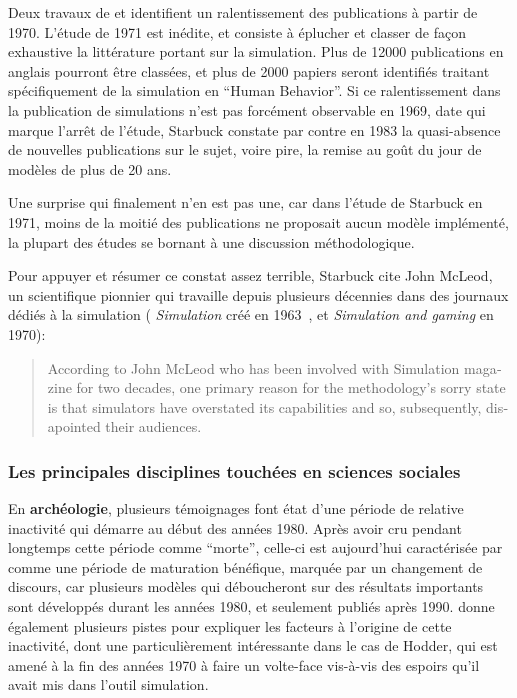 Deux travaux de \textcite{Dutton1971} et \textcite{Starbuck1983} identifient un ralentissement des publications à partir de 1970. L'étude de 1971 est inédite, et consiste à éplucher et classer de façon exhaustive la littérature portant sur la simulation. Plus de 12000 publications en anglais pourront être classées, et plus de 2000 papiers seront identifiés traitant spécifiquement de la simulation en \foreignquote{english}{Human Behavior}. Si ce ralentissement dans la publication de simulations n'est pas forcément observable en 1969, date qui marque l'arrêt de l'étude, Starbuck constate par contre en 1983 la quasi-absence de nouvelles publications sur le sujet, voire pire, la remise au goût du jour de modèles de plus de 20 ans.

Une surprise qui finalement n'en est pas une, car dans l'étude de Starbuck en 1971, moins de la moitié des publications ne proposait aucun modèle implémenté, la plupart des études se bornant à une discussion méthodologique.

Pour appuyer et résumer ce constat assez terrible, Starbuck cite John McLeod, un scientifique pionnier qui travaille depuis plusieurs décennies dans des journaux dédiés à la simulation ( \textit{Simulation} créé en 1963 , et \textit{Simulation and gaming} en 1970):

\foreignblockquote{english}[\cite{Starbuck1983}]{According to  John McLeod who has been involved with Simulation magazine for two decades, one primary reason for the methodology's sorry state is that simulators have overstated its capabilities and so, subsequently, disapointed their audiences.}

\subsubsection{Les principales disciplines touchées en sciences sociales}
\label{ssec:disciplines_touches}

En \textbf{archéologie}, plusieurs témoignages \autocite[6-7]{Lake2013} font état d'une période de relative inactivité qui démarre au début des années 1980. Après avoir cru pendant longtemps cette période comme \enquote{morte}, celle-ci est aujourd'hui caractérisée par \textcite{Lake2013} comme une période de maturation bénéfique, marquée par un changement de discours, car plusieurs modèles qui déboucheront sur des résultats importants sont développés durant les années 1980, et seulement publiés après 1990. \textcite{Lake2013} donne également plusieurs pistes pour expliquer les facteurs à l'origine de cette inactivité, dont une particulièrement intéressante dans le cas de Hodder, qui est amené à la fin des années 1970 à faire un volte-face vis-à-vis des espoirs qu'il avait mis dans l'outil simulation.

